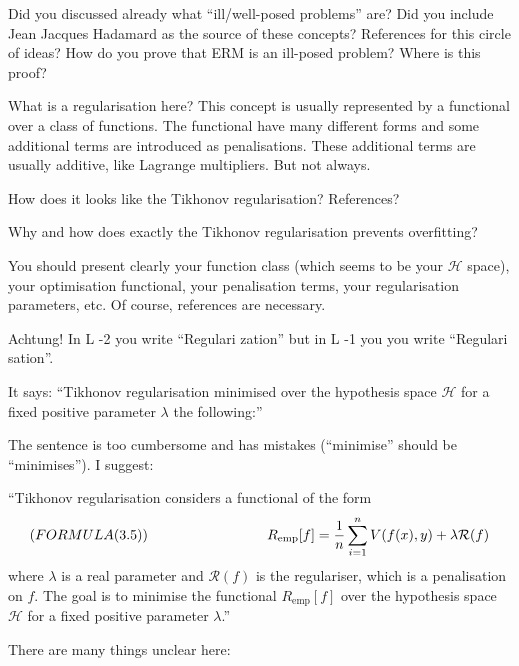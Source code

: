 \documentclass[12pt,reqno]{amsart}
\def\red#1{{\color{red} #1}}
\begin{document}
\begin{description}[style=unboxed,leftmargin=0cm,itemsep=3ex]
Did you discussed already what ``ill/well-posed problems'' are?
Did you include Jean Jacques Hadamard as the source of these concepts?
References for this circle of ideas?
How do you prove that ERM is an ill-posed problem?
Where is this proof?

What is a \red{regularisation} here?
This concept is usually represented by a functional over a class of
functions.
The functional have many different forms and some additional terms
are introduced as penalisations.
These additional terms are usually additive, like Lagrange multipliers.
But not always.

\red{How does it looks like the Tikhonov regularisation? References?}

\red{Why and how does exactly the Tikhonov regularisation prevents
overfitting?}

You should present clearly your function class (which seems to be your
$\mathcal H$ space), your optimisation functional, your penalisation
terms, your regularisation parameters, etc.
Of course, references are necessary.

\red{Achtung!}
In L -2 you write ``Regulari\red{z}ation'' but in L -1 you you write 
``Regulari\red{s}ation''.

It says: ``Tikhonov regularisation minimised over the hypothesis space
$\mathcal H$ for a fixed positive parameter $\lambda$ the following:''

The sentence is too cumbersome and has mistakes (``minimise'' should be
``minimises'').
I suggest:

``Tikhonov regularisation considers a functional of the form
$$
( FORMULA (3.5) ) \rule{3cm}{0pt} R_{\text{emp}}[f] 
= \frac{1}{n} \sum_{i=1}^n V(f(x),y) + \lambda \mathcal{R}(f)
$$
where $\lambda$ is a real parameter and $\mathcal{R}(f)$ is the
regulariser, which is a penalisation on $f$.
The goal is to minimise the functional $R_{\text{emp}}[f]$ over the
hypothesis space $\mathcal H$ for a fixed positive parameter $\lambda$.''

There are many things unclear here:


\end{description}
\end{document}
